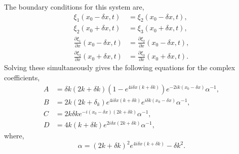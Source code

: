 The boundary conditions for this system are,
%
\begin{align*}
    \xi_1(x_0 - \delta x, t) &= \xi_2(x_0 - \delta x, t), \\
    \xi_2(x_0 + \delta x, t) &= \xi_3(x_0 + \delta x, t), \\
    \frac{\partial \xi_1}{\partial x}(x_0 - \delta x, t) &= \frac{\partial \xi_2}{\partial x}(x_0 - \delta x, t), \\
    \frac{\partial \xi_2}{\partial x}(x_0 + \delta x, t) &= \frac{\partial \xi_3}{\partial x}(x_0 + \delta x, t).
\end{align*}
%
Solving these simultaneously gives the following equations for the complex coefficients,
%
\begin{align}
    A &= \delta k (2k + \delta k) (1 - e^{4i \delta x (k + \delta k)}) e^{- 2i k (x_0 - \delta x)} \alpha^{-1}, \\
    B &= 2 k (2k + \delta_k) e^{4i \delta x (k + \delta k)} e^{i \delta k (x_0 - \delta x)} \alpha^{-1}, \\
    C &= 2 k \delta k e^{- i (x_0 - \delta x) (2k + \delta k)} \alpha^{-1}, \\
    D &= 4 k (k + \delta k) e^{2 i \delta x (2k + \delta k)} \alpha^{-1},
\end{align}
%
where,
\begin{equation}
    \alpha = (2k + \delta k)^2 e^{4 i \delta x (k + \delta k)} - \delta k^2.
\end{equation}
%

